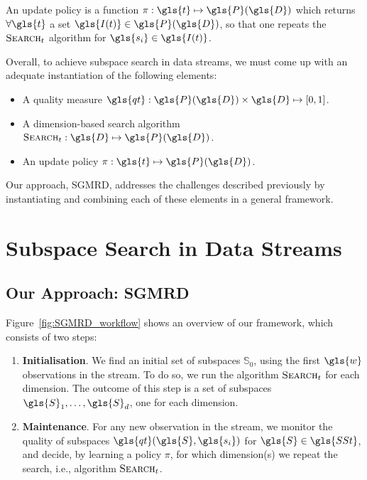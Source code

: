 \begin{definition}
	An update policy is a function $\pi: \gls{t} \mapsto \gls{P}(\gls{D})$ which returns $\forall \gls{t}$ a set $\gls{I(t)} \in \gls{P}(\gls{D})$, so that one repeats the $\textsc{Search}_t$ algorithm for $\gls{s_i} \in \gls{I(t)}$.    
\end{definition}

Overall, to achieve subspace search in data streams, we must come up with an adequate instantiation of the following elements:  

\begin{itemize}[noitemsep] 
	\item A quality measure $\gls{qt}: \gls{P}(\gls{D}) \times \gls{D}  \mapsto [0,1]$.
	\item A dimension-based search algorithm $\textsc{Search}_t: \gls{D} \mapsto \gls{P}(\gls{D})$. 
	\item An update policy $\pi: \gls{t} \mapsto \gls{P}(\gls{D})$.
\end{itemize}

Our approach, \acrfull{SGMRD}, addresses the challenges described previously by instantiating and combining each of these elements in a general framework. %

\section{Subspace Search in Data Streams}

\subsection{Our Approach: \acrshort{SGMRD}}

Figure~\ref{fig:SGMRD_workflow} shows an overview of our framework, which consists of two steps: 
\begin{enumerate}[noitemsep]
	\item \textbf{Initialisation}. We find an initial set of subspaces $\mathbb{S}_0$, using the first $\gls{w}$ observations in the stream. 
	To do so, we run the algorithm $\textsc{Search}_t$ for each dimension. 
	The outcome of this step is a set of subspaces $\gls{S}_1, \dots, \gls{S}_d$, one for each dimension. 
	\item \textbf{Maintenance}. For any new observation in the stream, we monitor the quality of subspaces $\gls{qt}(\gls{S}, \gls{s_i})$ for $\gls{S} \in \gls{SSt}$, and decide, by learning a policy $\pi$, for which dimension(s) we repeat the search, i.e., algorithm $\textsc{Search}_t$. 
\end{enumerate}

